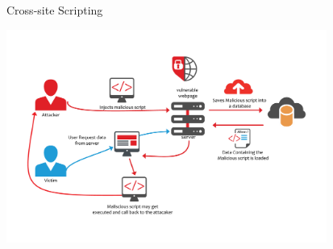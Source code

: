 \begin{frame}[fragile]{Cross-site Scripting}
  \begin{center}
    \includegraphics[height=7cm, keepaspectratio]{sources/images/Diagram-Describing-Blind-XSS-Attack.png}
  \end{center}
\end{frame}